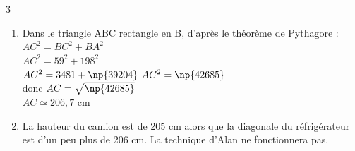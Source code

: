 \documentclass[a4paper]{book}
\begin{document}
{\begin{exerciceNote}{3}
        \bigskip

        \begin{enumerate}
            \item Dans le triangle ABC rectangle en B, d'après le théorème de Pythagore :\\
            $AC^2=BC^2+BA^2$\\
            $AC^2=59^2+198^2$\\
            $AC^2=3481+\np{39204}$
            $AC^2=\np{42685}$\\
            donc $AC=\sqrt{\np{42685}}$\\
            $AC\simeq 206,7$ cm

            \item La hauteur du camion est de 205 cm alors que la diagonale du réfrigérateur est d'un peu plus de  206 cm. La technique d'Alan ne fonctionnera pas.
        \end{enumerate}
    \end{exerciceNote}

}
\end{document}
